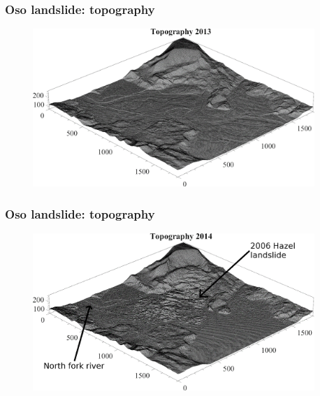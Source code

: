 \documentclass[notes]{beamer}
\begin{document}
\begin{frame}
	\frametitle{Oso landslide: topography}
	\begin{figure}
		\includegraphics[width=0.95\textwidth]{figs/oso/topography-2013.png}
	\end{figure}
\end{frame}

\begin{frame}
	\frametitle{Oso landslide: topography}
	\begin{figure}
		\includegraphics[width=0.95\textwidth]{figs/oso/topography-2014.png}
	\end{figure}
\end{frame}
\end{document}
